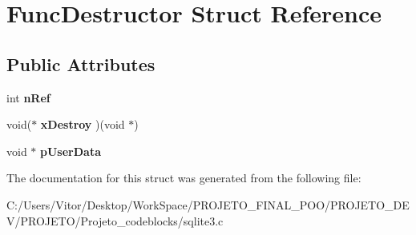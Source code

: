 \hypertarget{struct_func_destructor}{\section{Func\-Destructor Struct Reference}
\label{struct_func_destructor}
}
\subsection*{Public Attributes}
\begin{DoxyCompactItemize}
\item 
\hypertarget{struct_func_destructor_a8b1bf3af00c88400efc1dd74a4410463}{int {\bfseries n\-Ref}}\label{struct_func_destructor_a8b1bf3af00c88400efc1dd74a4410463}

\item 
\hypertarget{struct_func_destructor_a8d688d51ad881306c81b3f8d4795e076}{void($\ast$ {\bfseries x\-Destroy} )(void $\ast$)}\label{struct_func_destructor_a8d688d51ad881306c81b3f8d4795e076}

\item 
\hypertarget{struct_func_destructor_a181875609f0f8221985cd6cfd7ad8cd8}{void $\ast$ {\bfseries p\-User\-Data}}\label{struct_func_destructor_a181875609f0f8221985cd6cfd7ad8cd8}

\end{DoxyCompactItemize}


The documentation for this struct was generated from the following file\-:\begin{DoxyCompactItemize}
\item 
C\-:/\-Users/\-Vitor/\-Desktop/\-Work\-Space/\-P\-R\-O\-J\-E\-T\-O\-\_\-\-F\-I\-N\-A\-L\-\_\-\-P\-O\-O/\-P\-R\-O\-J\-E\-T\-O\-\_\-\-D\-E\-V/\-P\-R\-O\-J\-E\-T\-O/\-Projeto\-\_\-codeblocks/sqlite3.\-c\end{DoxyCompactItemize}
